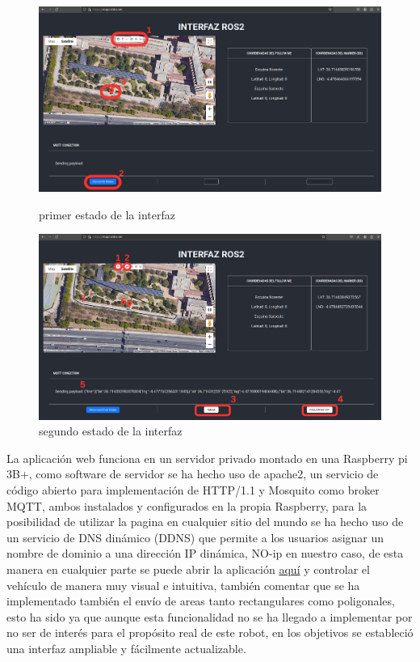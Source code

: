 \begin{figure}[htbp]
  \centering
  \begin{minipage}[b]{0.45\textwidth}
    \centering
    \includegraphics[width=\textwidth]{images/interfaz_1.png}
    \caption{primer estado de la interfaz}
    \label{fig:interfaz_1}
  \end{minipage}
  \hfill
  \begin{minipage}[b]{0.45\textwidth}
    \centering
    \includegraphics[width=\textwidth]{images/interfaz_2.png}
    \caption{segundo estado de la interfaz}
    \label{fig:interfaz_2}
  \end{minipage}
\end{figure}

La aplicación web funciona en un servidor privado montado en una Raspberry pi 3B+, como software de servidor se ha hecho uso de apache2, 
un servicio de código abierto para implementación de HTTP/1.1 y Mosquito como broker MQTT, ambos instalados y configurados en la propia 
Raspberry, para la posibilidad de utilizar la pagina en cualquier sitio del mundo se ha hecho uso de un servicio de DNS dinámico (DDNS) 
que permite a los usuarios asignar un nombre de dominio a una dirección IP dinámica, NO-ip en nuestro caso, de esta manera en cualquier 
parte se puede abrir la aplicación \href{https://mapir.ddns.net}{aquí} y controlar el vehículo de manera muy visual e intuitiva, también 
comentar que se ha implementado también el envío de areas tanto rectangulares como poligonales, esto ha sido ya que aunque esta 
funcionalidad no se ha llegado a implementar por no ser de interés para el propósito real de este robot, en los objetivos se estableció 
una interfaz ampliable y fácilmente actualizable.


